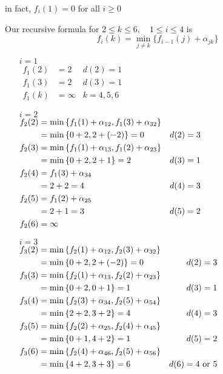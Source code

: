 \begin{prob}
\begin{enumerate}[label = {\textbf{(\greek*)}}]
\begin{sol}
    in fact, $f_i(1)=0$ for all $i\geq0$
    
    Our recursive formula for $2\leq k\leq 6,\quad 1\leq i\leq 4$ is 
    $$f_i(k) = \min\limits_{j\neq k} \{ f_{i-1}(j)+\alpha_{jk}\}$$
    
    \begin{itemize}
        \item[\underline{$i=1$}] \hspace{0.1cm} \\
    $\begin{aligned}
    f_1(2)&=2 & d(2)=1 \\
    f_1(3)&=2 & d(3)=1 \\
    f_1(k)&=\infty & k=4,5,6
    \end{aligned}$
    
    \item[\underline{$i=2$}] \hspace{0.1cm} \\
    $\begin{aligned}
    f_2(2)&=\min\left\{f_1(1)+\alpha_{12},f_1(3)+\alpha_{32}\right\} \\
    &=\min\left\{0+2,2+(-2)\right\}=0 & d(2)=3 \\
    f_2(3)&=\min\left\{f_1(1)+\alpha_{13},f_1(2)+\alpha_{23}\right\} \\
    &=\min\left\{0+2,2+1\right\}=2 & d(3)=1 \\
    f_2(4)&=f_1(3)+\alpha_{34} \\
    &= 2+2=4 & d(4)=3 \\
    f_2(5)&=f_1(2)+\alpha_{25} \\
    &= 2+1=3 & d(5)=2 \\
    f_2(6)&=\infty 
    \end{aligned}$
    
    \item[\underline{$i=3$}] \hspace{0.1cm} \\
    $\begin{aligned}
    f_3(2)&=\min\left\{f_2(1)+\alpha_{12},f_2(3)+\alpha_{32}\right\} \\
    &=\min\left\{0+2,2+(-2)\right\}=0 & d(2)=3 \\
    f_3(3)&=\min\left\{f_2(1)+\alpha_{13},f_2(2)+\alpha_{23}\right\} \\
    &=\min\left\{0+2,0+1\right\}=1 & d(3)=1 \\
    f_3(4)&=\min\left\{f_2(3)+\alpha_{34},f_2(5)+\alpha_{54}\right\} \\
    &=\min\left\{2+2,3+2\right\}=4 & d(4)=3 \\
    f_3(5)&=\min\left\{f_2(2)+\alpha_{25},f_2(4)+\alpha_{45}\right\} \\
    &=\min\left\{0+1,4+2\right\}=1 & d(5)=2 \\
    f_3(6)&=\min\left\{f_2(4)+\alpha_{46},f_2(5)+\alpha_{56}\right\} \\
    &=\min\left\{4+2,3+3\right\}=6 & d(6)=4 \ \text{or} \ 5
    \end{aligned}$
    

\end{itemize}
\end{sol}
\end{enumerate}
\end{prob}

